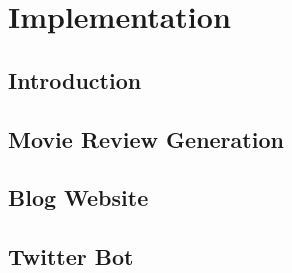 
\chapter{\label{ch:4-implementation} Implementation}


\section{Introduction}

\section{Movie Review Generation}

\section{Blog Website}

\section{Twitter Bot}

